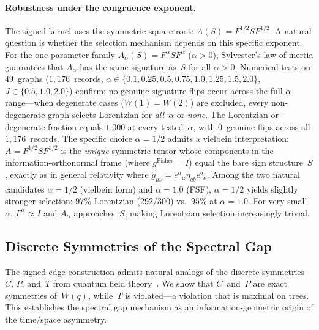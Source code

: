 \documentclass[11pt]{article}
\theoremstyle{definition}
\theoremstyle{remark}
\begin{document}
\paragraph{Robustness under the congruence exponent.}
The signed kernel uses the symmetric square root: $A(S) = F^{1/2} S F^{1/2}$.
A natural question is whether the selection mechanism depends on this specific
exponent. For the one-parameter family $A_\alpha(S) = F^\alpha S F^\alpha$
($\alpha > 0$), Sylvester's law of inertia guarantees that $A_\alpha$ has
the same signature as~$S$ for all $\alpha > 0$.
Numerical tests on $49$~graphs ($1{,}176$~records, $\alpha \in
\{0.1, 0.25, 0.5, 0.75, 1.0, 1.25, 1.5, 2.0\}$, $J \in \{0.5, 1.0, 2.0\}$)
confirm: no genuine signature flips occur across the full $\alpha$
range---when degenerate cases ($W(1) = W(2)$) are excluded, every
non-degenerate graph selects Lorentzian for \emph{all}~$\alpha$ or
\emph{none}. The Lorentzian-or-degenerate fraction equals $1.000$
at every tested~$\alpha$, with $0$~genuine flips across all
$1{,}176$~records. The specific choice $\alpha = 1/2$
admits a vielbein interpretation: $A = F^{1/2} S F^{1/2}$ is the
\emph{unique} symmetric tensor whose components in the
information-orthonormal frame (where $g^{\mathrm{Fisher}} = I$) equal
the bare sign structure~$S$, exactly as in general relativity where
$g_{\mu\nu} = e^a{}_\mu \eta_{ab} e^b{}_\nu$.
Among the two natural candidates $\alpha = 1/2$ (vielbein form) and
$\alpha = 1.0$ (FSF), $\alpha = 1/2$ yields slightly stronger selection:
$97\%$ Lorentzian ($292/300$) vs.\ $95\%$ at $\alpha = 1.0$.
For very small~$\alpha$, $F^\alpha \approx I$ and $A_\alpha$ approaches~$S$,
making Lorentzian selection increasingly trivial.

\subsection{Discrete Symmetries of the Spectral Gap}
\label{sec:cpt}

The signed-edge construction admits natural analogs of the discrete
symmetries~$C$, $P$, and~$T$ from quantum field theory~\cite{Weinberg1995QTF1}.
We show that
$C$~and~$P$ are exact symmetries of~$W(q)$, while~$T$ is violated---a
violation that is maximal on trees. This establishes the spectral gap
mechanism as an information-geometric origin of the time/space asymmetry.
\end{document}
